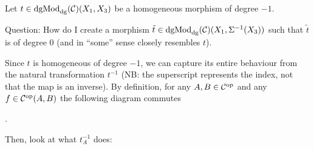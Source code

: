 \begin{question}
    Let \( t \in \operatorname{dgMod}_{\operatorname{dg}}({\mathcal{C}})(X_1, X_3) \) be a homogeneous morphism of degree \( -1 \).

    Question: How do I create a morphism \( \tilde{t} \in \operatorname{dgMod}_{\operatorname{dg}}({\mathcal{C}})(X_1, \Sigma^{-1}(X_3)) \) such that \( \tilde{t} \) is of degree \( 0 \) (and in ``some'' sense closely resembles \( t \)).

    Since \( t \) is homogeneous of degree \( -1 \), we can capture its entire behaviour from the natural transformation \( t^{-1} \) (NB: the superscript represents the index, not that the map is an inverse). By definition, for any \( A, B \in {\mathcal{C}}^{\operatorname{op}} \) and any \( f \in {\mathcal{C}}^{\operatorname{op}}(A, B) \) the following diagram commutes
    \begin{center}
        .
    \end{center}

    Then, look at what \( t^{-1}_A \) does:
    \begin{center}
\end{center}
\end{question}
